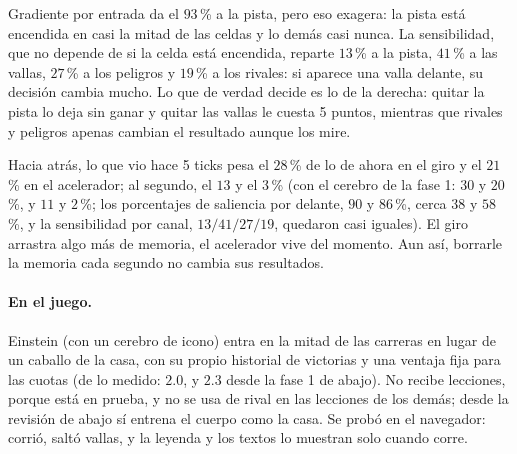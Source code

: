 \documentclass[11pt,letterpaper]{article}
\begin{document}
Gradiente por entrada da el $93$\,\% a la pista, pero eso exagera: la pista está encendida en casi la mitad de las celdas y lo demás casi nunca. La sensibilidad, que no depende de si la celda está encendida, reparte $13$\,\% a la pista, $41$\,\% a las vallas, $27$\,\% a los peligros y $19$\,\% a los rivales: si aparece una valla delante, su decisión cambia mucho. Lo que de verdad decide es lo de la derecha: quitar la pista lo deja sin ganar y quitar las vallas le cuesta 5 puntos, mientras que rivales y peligros apenas cambian el resultado aunque los mire.

Hacia atrás, lo que vio hace 5 ticks pesa el $28$\,\% de lo de ahora en el giro y el $21$\,\% en el acelerador; al segundo, el $13$ y el $3$\,\% (con el cerebro de la fase 1: $30$ y $20$\,\%, y $11$ y $2$\,\%; los porcentajes de saliencia por delante, $90$ y $86$\,\%, cerca $38$ y $58$\,\%, y la sensibilidad por canal, $13/41/27/19$, quedaron casi iguales). El giro arrastra algo más de memoria, el acelerador vive del momento. Aun así, borrarle la memoria cada segundo no cambia sus resultados.

\clearpage
\paragraph{En el juego.} Einstein (con un cerebro de icono) entra en la mitad de las carreras en lugar de un caballo de la casa, con su propio historial de victorias y una ventaja fija para las cuotas (de lo medido: $2.0$, y $2.3$ desde la fase 1 de abajo). No recibe lecciones, porque está en prueba, y no se usa de rival en las lecciones de los demás; desde la revisión de abajo sí entrena el cuerpo como la casa. Se probó en el navegador: corrió, saltó vallas, y la leyenda y los textos lo muestran solo cuando corre.
\end{document}
